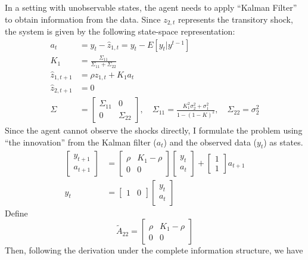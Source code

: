 \documentclass[11pt]{article}
\theoremstyle{definition}
\theoremstyle{boldtitle} %
\numberwithin{equation}{section}
\numberwithin{figure}{section}
\numberwithin{table}{section}
\begin{document}
In a setting with unobservable states, 
the agent needs to apply ``Kalman Filter'' to obtain information from the data.
Since $z_{2,t}$ represents the transitory shock, 
the system is given by the following state-space representation:
\begin{align*}
    a_t & = y_t - \hat{z}_{1, t} = y_t - E[y_t | y^{t-1}] \\
    K_1 & = \frac{\Sigma_{11}}{\Sigma_{11} + \Sigma_{22}} \\ 
    \hat{z}_{1, t+1} & = \rho \hat{z}_{1, t} + K_1 a_t \\ 
    \hat{z}_{2, t+1} & = 0 \\ 
    \Sigma & =   \left[ \begin{matrix}
        \Sigma_{11} & 0 \\ 0 & \Sigma_{22}
    \end{matrix}  \right], \quad  \Sigma_{11}  = \frac{K_1^2 \sigma_2^2 + \sigma_1^2}{1 - (1 - K)^2}, \quad  \Sigma_{22} = \sigma_2^2 
\end{align*} 
Since the agent cannot observe the shocks directly, 
I formulate the problem using ``the innovation'' from the Kalman filter ($a_t$) and 
the observed data ($y_t$) as states.
\begin{align*} 
    \begin{bmatrix} y_{t+1} \\ a_{t+1} \end{bmatrix} & = 
    \begin{bmatrix} \rho & K_1 - \rho \\ 0 & 0 \end{bmatrix} \begin{bmatrix} y_t \\ a_t \end{bmatrix} + \begin{bmatrix} 1 \\ 1 \end{bmatrix} a_{t+1} \\
    y_t & = \begin{bmatrix} 1 & 0 \end{bmatrix}  \begin{bmatrix} y_t \\ a_t \end{bmatrix}  
\end{align*}
Define 
\[
\tilde{A}_{22} = \begin{bmatrix} \rho & K_1 - \rho \\ 0 & 0 \end{bmatrix}  
\]
Then, following the derivation under the complete information structure, we have 
\end{document}
